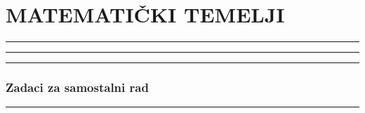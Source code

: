 \documentclass[10pt]{book}
\begin{document}
\tableofcontents
\clearpage


\clearpage


\chapter{MATEMATIČKI TEMELJI}





%

\noindent
{\color{boja} \rule{\linewidth}{0.3mm} }

\vspace{0.2cm}




\noindent
{\color{boja} \rule{\linewidth}{0.3mm} }





\vspace{0.2cm}
\noindent
{\color{boja} \rule{\linewidth}{0.3mm} }


\vspace{0.2cm} 

\subsection*{Zadaci za samostalni rad}


\vspace{0.2cm}
\noindent

\vspace{0.2cm} 

{\color{boja} \rule{\linewidth}{0.3mm} }

\vspace{0.2cm}
\noindent
\end{document}
